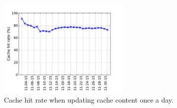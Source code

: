 \begin{figure}[t!]
\begin{center}
\includegraphics[width=2.5in]{figure/LRU_day}
\caption{Cache hit rate when updating cache content once a day.}
\label{fig:batchcache}
\end{center}
\end{figure}
